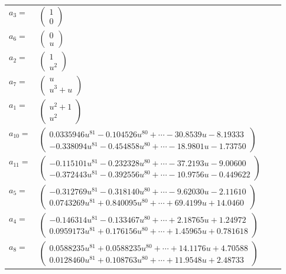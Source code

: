 \documentclass[1p]{elsarticle_modified}
\theoremstyle{definition}
\begin{document}
\begin{tabular}{m{7pt} m{180pt} m{7pt} m{180pt} }
\flushright $a_{3}=$&$\begin{pmatrix}1\\0\end{pmatrix}$ \\
\flushright $a_{6}=$&$\begin{pmatrix}0\\u\end{pmatrix}$ \\
\flushright $a_{2}=$&$\begin{pmatrix}1\\u^2\end{pmatrix}$ \\
\flushright $a_{7}=$&$\begin{pmatrix}u\\u^3+u\end{pmatrix}$ \\
\flushright $a_{1}=$&$\begin{pmatrix}u^2+1\\u^2\end{pmatrix}$ \\
\flushright $a_{10}=$&$\begin{pmatrix}0.0335946 u^{81}-0.104526 u^{80}+\cdots-30.8539 u-8.19333\\-0.338094 u^{81}-0.454858 u^{80}+\cdots-18.9801 u-1.73750\end{pmatrix}$ \\
\flushright $a_{11}=$&$\begin{pmatrix}-0.115101 u^{81}-0.232328 u^{80}+\cdots-37.2193 u-9.00600\\-0.372443 u^{81}-0.392556 u^{80}+\cdots-10.9756 u-0.449622\end{pmatrix}$ \\
\flushright $a_{5}=$&$\begin{pmatrix}-0.312769 u^{81}-0.318140 u^{80}+\cdots-9.62030 u-2.11610\\0.0743269 u^{81}+0.840095 u^{80}+\cdots+69.4199 u+14.0460\end{pmatrix}$ \\
\flushright $a_{4}=$&$\begin{pmatrix}-0.146314 u^{81}-0.133467 u^{80}+\cdots+2.18765 u+1.24972\\0.0959173 u^{81}+0.176156 u^{80}+\cdots+1.45965 u+0.781618\end{pmatrix}$ \\
\flushright $a_{8}=$&$\begin{pmatrix}0.0588235 u^{81}+0.0588235 u^{80}+\cdots+14.1176 u+4.70588\\0.0128460 u^{81}+0.108763 u^{80}+\cdots+11.9548 u+2.48733\end{pmatrix}$ \\

\end{tabular}
\end{document}
